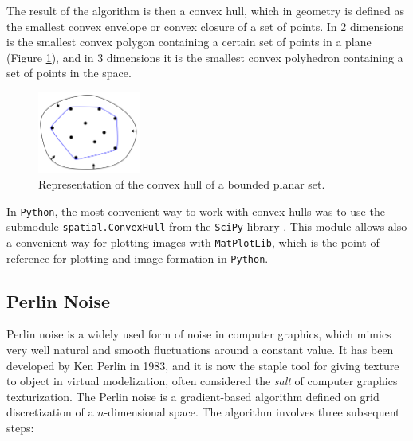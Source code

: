 The result of the algorithm is then a convex hull, which in geometry is defined as the smallest convex envelope or convex closure of a set of points. In 2 dimensions is the smallest convex polygon containing a certain set of points in a plane (Figure \ref{fig:conv_hull}), and in 3 dimensions it is the smallest convex polyhedron containing a set of points in the space.

\begin{figure}
    \centering
    \includegraphics[width = 0.3\textwidth]{images/conv_hull}
    \caption{Representation of the convex hull of a bounded planar set.}
    \label{fig:conv_hull}
\end{figure}

In \texttt{Python}, the most convenient way to work with convex hulls was to use the submodule \texttt{spatial.ConvexHull} from the \texttt{SciPy} library \cite{2020SciPy-NMeth}. This module allows also a convenient way for plotting images with \texttt{MatPlotLib}, which is the point of reference for plotting and image formation in \texttt{Python}.

\subsection{Perlin Noise}
Perlin noise is a widely used form of noise in computer graphics, which mimics very well natural and smooth fluctuations around a constant value. It has been developed by Ken Perlin in 1983, and it is now the staple tool for giving texture to object in virtual modelization, often considered the \textit{salt} of computer graphics texturization.
The Perlin noise is a gradient-based algorithm defined on grid discretization of a $n$-dimensional space. The algorithm involves three subsequent steps:

